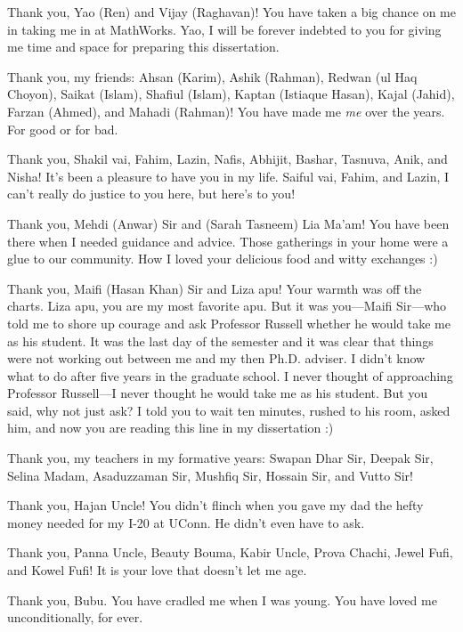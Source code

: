   \AckBreak
  Thank you, Yao (Ren) and Vijay (Raghavan)! 
  You have taken a big chance on me in taking me in at MathWorks. 
  Yao, I will be forever indebted to you for 
  giving me time and space 
  for preparing this dissertation.

  \AckBreak
  Thank you, my friends: Ahsan (Karim), Ashik (Rahman), 
  Redwan (ul Haq Choyon), Saikat (Islam), Shafiul (Islam), 
  Kaptan (Istiaque Hasan), Kajal (Jahid), 
  Farzan (Ahmed), and Mahadi (Rahman)! 
  You have made me \emph{me} over the years. For good or for bad.

  Thank you, Shakil vai, Fahim, Lazin, Nafis, Abhijit, 
  Bashar, Tasnuva, Anik, and Nisha! 
  It's been a pleasure to have you in my life. 
  Saiful vai, Fahim, and Lazin, 
  I can't really do justice to you here, but here's to you!

  Thank you, Mehdi (Anwar) Sir and (Sarah Tasneem) Lia Ma'am! 
  You have been there when I needed guidance and advice. 
  Those gatherings in your home were 
  a glue to our community. 
  How I loved your delicious food and witty exchanges :)
  
  Thank you, Maifi (Hasan Khan) Sir and Liza apu! 
  Your warmth was off the charts. 
  Liza apu, you are my most favorite apu. 
  But it was you---Maifi Sir---who told me to shore up courage and ask 
  Professor Russell whether he would take me as his student. 
  It was the last day of the semester and 
  it was clear that things were not working out between me and my then Ph.D. adviser. 
  I didn't know what to do after five years in the graduate school. 
  I never thought of approaching Professor Russell---I never thought he would take me as his student. 
  But you said, why not just ask? 
  I told you to wait ten minutes, rushed to his room, 
  asked him, and now you are reading this line in my dissertation :)

  Thank you, my teachers in my formative years: 
  Swapan Dhar Sir, Deepak Sir, Selina Madam, Asaduzzaman Sir, Mushfiq Sir, Hossain Sir, and Vutto Sir! 

  Thank you, Hajan Uncle! You didn't flinch when you gave my dad the hefty money 
  needed for my I-20 at UConn. He didn't even have to ask.

  Thank you, Panna Uncle, Beauty Bouma, Kabir Uncle, Prova Chachi, Jewel Fufi, and Kowel Fufi! 
  It is your love that doesn't let me age.

  Thank you, Bubu. You have cradled me when I was young. 
  You have loved me unconditionally, for ever.

